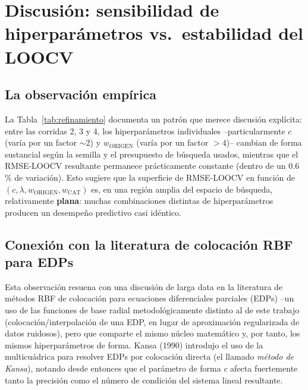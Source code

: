 \documentclass[11pt,a4paper]{article}
\begin{document}
\section{Discusi\'on: sensibilidad de hiperpar\'ametros vs.\ estabilidad del LOOCV}
\label{sec:discusion}

\subsection{La observaci\'on emp\'irica}

La Tabla~\ref{tab:refinamiento} documenta un patr\'on que merece discusi\'on
expl\'icita: entre las corridas 2, 3 y 4, los hiperpar\'ametros individuales
--particularmente $c$ (var\'ia por un factor $\sim$2) y $w_{\text{ORIGEN}}$
(var\'ia por un factor $>4$)-- cambian de forma sustancial seg\'un la
semilla y el presupuesto de b\'usqueda usados, mientras que el
RMSE-LOOCV resultante permanece pr\'acticamente constante (dentro de un
0.6\,\% de variaci\'on). Esto sugiere que la superficie de RMSE-LOOCV en
funci\'on de $(c,\lambda,w_{\text{ORIGEN}},w_{\text{CAT}})$ es, en una
regi\'on amplia del espacio de b\'usqueda, relativamente \textbf{plana}:
muchas combinaciones distintas de hiperpar\'ametros producen un desempe\~no
predictivo casi id\'entico.

\subsection{Conexi\'on con la literatura de colocaci\'on RBF para EDPs}

Esta observaci\'on resuena con una discusi\'on de larga data en la
literatura de m\'etodos RBF de colocaci\'on para ecuaciones diferenciales
parciales (EDPs) --un uso de las funciones de base radial metodol\'ogicamente
distinto al de este trabajo (colocaci\'on/interpolaci\'on de una EDP, en
lugar de aproximaci\'on regularizada de datos ruidosos), pero que comparte
el mismo n\'ucleo matem\'atico y, por tanto, los mismos hiperpar\'ametros de
forma. Kansa (1990) \cite{kansa1990a,kansa1990b} introdujo el uso de la
multicu\'adrica para resolver EDPs por colocaci\'on directa (el llamado
\emph{m\'etodo de Kansa}), notando desde entonces que el par\'ametro de
forma $c$ afecta fuertemente tanto la precisi\'on como el n\'umero de
condici\'on del sistema lineal resultante.
\end{document}
